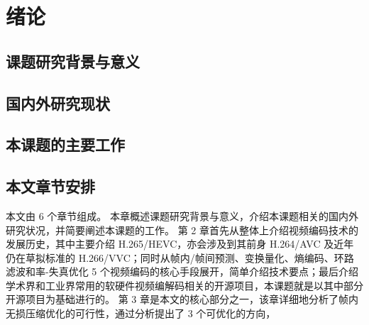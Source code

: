 \chapter{绪论}
\label{cha:c1}

\section{课题研究背景与意义}

\section{国内外研究现状}

\section{本课题的主要工作}

\section{本文章节安排}
本文由 6 个章节组成。
本章概述课题研究背景与意义，介绍本课题相关的国内外研究状况，并简要阐述本课题的工作。
第 2 章首先从整体上介绍视频编码技术的发展历史，其中主要介绍 H.265/HEVC，亦会涉及到其前身 H.264/AVC 及近年仍在草拟标准的 H.266/VVC；同时从帧内/帧间预测、变换量化、熵编码、环路滤波和率-失真优化 5 个视频编码的核心手段展开，简单介绍技术要点；最后介绍学术界和工业界常用的软硬件视频编解码相关的开源项目，本课题就是以其中部分开源项目为基础进行的。
第 3 章是本文的核心部分之一，该章详细地分析了帧内无损压缩优化的可行性，通过分析提出了 3 个可优化的方向，